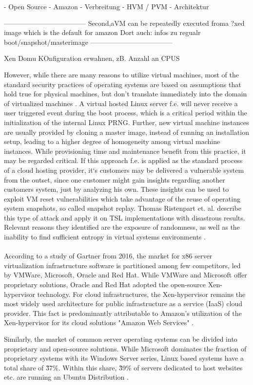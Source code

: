 - Open Source
- Amazon
- Verbreitung 
- HVM / PVM
- Architektur

------------------------------------
\cite{everspaugh2014not}
Second,aVM  can be repeatedly executed froma ?xed image which is the default for amazon
Dort auch: infos zu regualr boot/snapshot/masterimage
------------------------------------

Xen Domu KOnfiguration erwahnen, zB. Anzahl an CPUS

However, while there are many reasons to utilize virtual machines, most of the standard security practices of operating systems are based on assumptions that hold true for physical machines, but don't translate immediately into the domain of virtualized machines \cite{kerrigan2012study}. A virtual hosted Linux server f.e. will never receive a user triggered event during the boot process, which is a critical period within the initialization of the internal Linux PRNG. Further, new virtual machine instances are usually provided by cloning a master image, instead of running an installation setup, leading to a higher degree of homogeneity among virtual machine instances. While provisioning time and maintenance benefit from this practice, it may be regarded critical. If this approach f.e. is applied as the standard process of a cloud hosting provider, it`s customers may be delivered a vulnerable system from the outset, since one customer might gain insights regarding another customers system, just by analyzing his own. These insights can be used to exploit VM reset vulnerabilities which take advantage of the reuse of  operating system snapshots, so called snapshot replay. Thomas Ristenpart et. al. describe this type of attack and apply it on TSL implementations with disastrous results. Relevant reasons they identified are the exposure of randomness, as well as the inability to find sufficient entropy in virtual systems environments \cite{ristenpart2010good, ristenpart2009hey}. \\~\\
According to a study of Gartner from 2016, the market for x86 server virtualization infrastructure software is partitioned among few competitors, led by VMWare, Microsoft, Oracle and Red Hat. While VMWare and Microsoft offer proprietary solutions, Oracle and Red Hat adopted the open-source Xen-hypervisor technology. For cloud infrastructures, the Xen-hypervisor remains the most widely used architecture for public infrastructure as a service (IaaS) cloud provider. This fact is predominantly attributable to Amazon's utilization of the Xen-hypervisor for its cloud solutions "Amazon Web Services" \cite{bittman2016magic}. 

Similarly, the market of common server operating systems can be divided into proprietary and open-source solutions. While Microsoft dominates the fraction of proprietary systems with its Windows Server series, Linux based systems have a total share of \~37\%. Within this share, \~39\% of servers dedicated to host websites etc. are running an Ubuntu Distribution \cite{statsharelinux} . \\~\\


